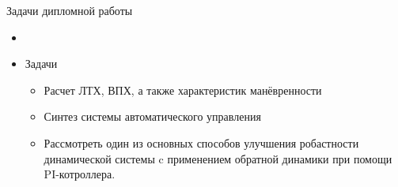 \begin{frame}{Задачи дипломной работы}
\begin{itemize}
    \item  []
    \item  [] \begin{block}{Задачи}
        \begin{itemize}
        \item Расчет ЛТХ, ВПХ, а также характеристик манёвренности
        \item Синтез системы автоматического управления
        \item Рассмотреть один из основных способов улучшения робастности динамической 
        системы c применением обратной динамики при помощи PI-котроллера.
        \end{itemize}
    \end{block}
\end{itemize}    
\end{frame}